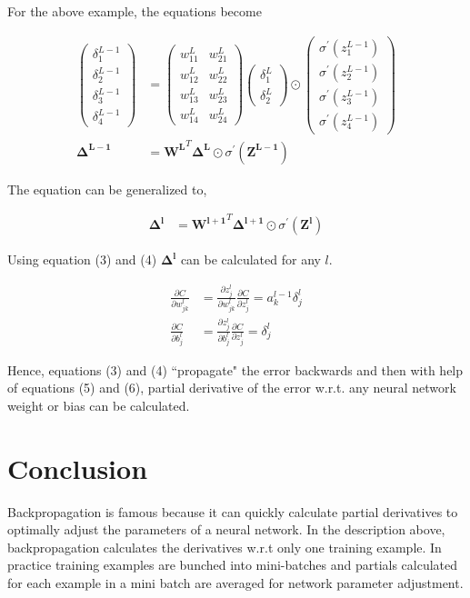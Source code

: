 \documentclass[11pt, a4paper]{article}
\begin{document}
For the above example, the equations become

\begin{align*}
	\begin{pmatrix} \delta^{L-1}_1 \\ \delta^{L-1}_2 \\ \delta^{L-1}_3 \\ \delta^{L-1}_4 \end{pmatrix} &= \begin{pmatrix}  w^L_{11} & w^L_{21} \\ w^L_{12} & w^L_{22} \\ w^L_{13} & w^L_{23} \\w^L_{14} & w^L_{24}  \end{pmatrix} \begin{pmatrix} \delta^L_1 \\ \delta^L_2 \end{pmatrix} \odot \begin{pmatrix} \sigma^{'}(z^{L-1}_1) \\ \sigma^{'}(z^{L-1}_2) \\ \sigma^{'}(z^{L-1}_3) \\ \sigma^{'}(z^{L-1}_4) \end{pmatrix} \\		
	\boldsymbol{\Delta^{L-1}} &= \boldsymbol{W^L}^T \boldsymbol{\Delta^L} \odot \sigma^{'}(\boldsymbol{Z^{L-1}})
\end{align*}

The equation can be generalized to,

\begin{align}
	\boldsymbol{\Delta^{l}} & = \boldsymbol{W^{l+1}}^T \boldsymbol{\Delta^{l+1}} \odot \sigma^{'}(\boldsymbol{Z^{l}}) 
\end{align}

Using equation (3) and (4) $\boldsymbol{\Delta^{l}}$ can be calculated for any $l$.

\begin{align}
	\frac{\partial C}{\partial w^l_{jk}} & = \frac{\partial z^l_{j}}{\partial w^l_{jk}} \frac{\partial C}{\partial z^l_{j}}             
	= a^{l-1}_k \delta^l_j \\
	\frac{\partial C}{\partial b^l_{j}}  & = \frac{\partial z^l_{j}}{\partial b^l_{j}} \frac{\partial C}{\partial z^l_{j}} = \delta^l_j 
\end{align}

Hence, equations (3) and (4) ``propagate" the error backwards and then with help of equations (5) and (6), partial derivative of the error w.r.t. any neural network weight or bias can be calculated.

\section{Conclusion}

Backpropagation is famous because it can quickly calculate partial derivatives to optimally adjust the parameters of a neural network. In the description above, backpropagation calculates the derivatives w.r.t only one training example. In practice training examples are bunched into mini-batches and partials calculated for each example in a mini batch are averaged for network parameter adjustment.
\end{document}
